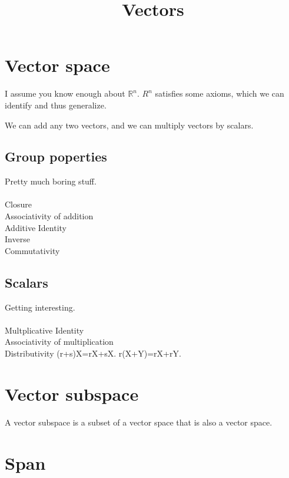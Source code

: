 \documentclass{article}
\title{Vectors}
\date{}
\begin{document}
\maketitle

\section{Vector space}

I assume you know enough about $\mathbb{R}^n$. $R^n$ satisfies some axioms, which we can identify and thus generalize.

We can add any two vectors, and we can multiply vectors by scalars.

\subsection*{Group poperties}

Pretty much boring stuff.\\\\
Closure\\
Associativity of addition\\
Additive Identity\\
Inverse\\
Commutativity

\subsection*{Scalars}

Getting interesting.\\\\
Multplicative Identity\\
Associativity of multiplication\\
Distributivity 
(r+s)X=rX+sX. 	
r(X+Y)=rX+rY. 	

\section{Vector subspace}

A vector subspace is a subset of a vector space that is also a vector space.

\section{Span}
\end{document}
